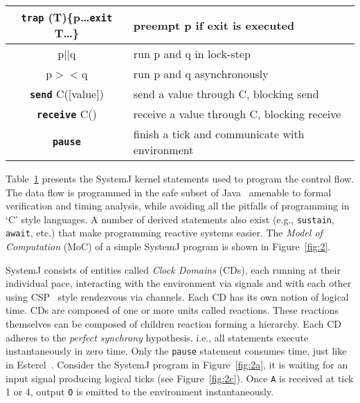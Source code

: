 \begin{table}[tb]
\begin{minipage}{8cm}
\begin{scriptsize}
\begin{tabular}{|c|p{80pt}|}
     \textbf{\texttt{trap}} (T)\{p\ldots \textbf{\texttt{exit}} T\ldots\} & preempt p if exit is executed\\                         
     \hline                                                                                     
     p\textbf{\texttt{$||$}}q & run p and q in lock-step\\                                                        
     \hline                                                                                     
     p$><$q & run p and q asynchronously\\                                                      
     \hline                                                                                     
     \textbf{\texttt{send}} C([value]) & send a value through C, blocking
     send\\                                                 
     \hline                                                                                     
     \textbf{\texttt{receive}} C() & receive a value through C, blocking
     receive\\
     \hline                                                                                     
     \textbf{\texttt{pause}} & finish a tick and communicate
     with environment\\
     \hline                                                                                     
   \end{tabular}
  \end{scriptsize}
 \end{minipage}
 \label{tab:1}
\end{table}

Table~\ref{tab:1} presents the SystemJ kernel statements used to program
the control flow. The data flow is programmed in the safe subset of
Java~\cite{scj2013} amenable to formal verification and timing analysis,
while avoiding all the pitfalls of programming in `C' style languages. A
number of derived statements also exist (e.g., \texttt{sustain},
\texttt{await}, etc.) that make programming reactive systems easier. The
\textit{Model of Computation} (MoC) of a simple SystemJ program is shown
in Figure~\ref{fig:2}.

SystemJ consists of entities called \textit{Clock Domains} (CDs), each
running at their individual pace, interacting with the environment via
signals and with each other using CSP~\cite{choa85} style rendezvous via
channels. Each CD has its own notion of logical time. CDs are composed
of one or more units called reactions. These reactions themselves can be
composed of children reaction forming a hierarchy. Each CD adheres to
the \textit{perfect synchrony} hypothesis, i.e., all statements execute
instantaneously in zero time. Only the \texttt{pause} statement consumes
time, just like in Esterel~\cite{gber931}. Consider the SystemJ program
in Figure~\ref{fig:2a}, it is waiting for an input signal producing
logical ticks (see Figure~\ref{fig:2c}). Once \texttt{A} is received at
tick 1 or 4, output \texttt{O} is emitted to the environment
instantaneously.

